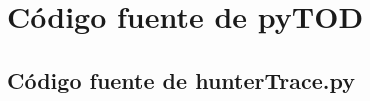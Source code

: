 \documentclass[12pt,legalpaper]{report}
\begin{document}
\begin{thebibliography}{30}





\end{thebibliography}

\appendix
\appendixpage
\addappheadtotoc
\pagebreak
\chapter{Código fuente de pyTOD}

	\section{Código fuente de hunterTrace.py}
	
\end{document}
